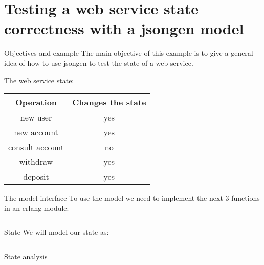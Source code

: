 \section{Testing a web service state correctness with a jsongen model}

\begin{frame}{Objectives and example}
  The main objective of this example is to give a general idea of how
  to use jsongen to test the state of a web service.

  The web service state:\\

  \centering
  \begin{tabular}{| c | c |}
    \hline
    \textbf{Operation}   & \textbf{Changes the state} \\ \hline
    new user    & yes \\ \hline
    new account & yes \\ \hline
    consult account & no \\ \hline
    withdraw    & yes \\ \hline
    deposit     & yes \\ \hline
  \end{tabular}
  \centering
\end{frame}

\begin{frame}{The model interface}
  To use the model we need to implement the next 3 functions in an
  erlang module:

  \inputminted{erlang}{./code/interface.erl}
\end{frame}

\begin{frame}{State}
  We will model our state as:

  \inputminted{erlang}{./code/state.erl}
\end{frame}

\begin{frame}{State analysis}
  \begin{figure}
    \centering
    \begin{overprint}[\textwidth]
    \end{overprint}
  \end{figure}
\end{frame}

